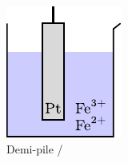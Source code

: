 \documentclass[../../main/main.tex]{subfiles}
\begin{document}
\begin{tcb*}
\begin{minipage}[c]{.30\linewidth}
\begin{center}
{			}{
				\includegraphics[width=.5\linewidth]{piledemi_Fe}
			}
			\\
			Demi-pile /
			\\
		\end{center}
	\end{minipage}
	\hspace*{\fill}
	\begin{minipage}[c]{.30\linewidth}
		\begin{center}
\end{center}
\end{minipage}
\end{tcb*}
\end{document}
